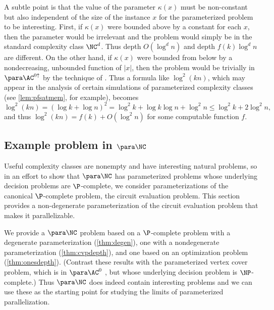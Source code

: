 A subtle point is that the value of the parameter $\kappa(x)$ must be non-constant but also independent of the size of the instance $x$ for the parameterized problem to be interesting.
First, if $\kappa(x)$ were bounded above by a constant for each $x$, then the parameter would be irrelevant and the problem would simply be in the standard complexity class $\NC^d$.
Thus depth $O(\log^d n)$ and depth $f(k) \log^d n$ are different.
On the other hand, if $\kappa(x)$ were bounded from below by a nondecreasing, unbounded function of $|x|$, then the problem would be trivially in $\para \AC^{0 \uparrow}$ by the technique of \autocite[Proposition~1.7]{fg06}.
Thus a formula like $\log^2 (kn)$, which may appear in the analysis of certain simulations of parameterized complexity classes (see \autoref{lem:pfsatmem}, for example), becomes
\[
\log^2 (kn) = (\log k + \log n)^2 = \log^2 k + \log k \log n + \log^2 n \leq \log^2 k + 2 \log^2 n,
\]
and thus $\log^2 (kn) = f(k) + O(\log^2 n)$ for some computable function $f$.

\subsection{Example problem in \texorpdfstring{$\para \NC$}{paraNC}}
\label{sec:parancexample}

%
%
%
Useful complexity classes are nonempty and have interesting natural problems,
%
%
%
so in an effort to show that $\para \NC$ has parameterized problems whose underlying decision problems are $\P$-complete,
%
%
%
we consider parameterizations of the canonical $\P$-complete problem, the circuit evaluation problem.
%
%
%
%
This section provides a non-degenerate parameterization of the circuit evaluation problem that makes it parallelizable.

%
%
%
We provide a $\para \NC$ problem based on a $\P$-complete problem with a degenerate parameterization (\autoref{thm:degen}), one with a nondegenerate parameterization (\autoref{thm:cvpdepth}), and one based on an optimization problem (\autoref{thm:onesdepth}).
(Contrast these results with the parameterized vertex cover problem, which is in $\para \AC^0$ \autocite{bst15}, but whose underlying decision problem is $\NP$-complete.)
%
%
%
Thus $\para \NC$ does indeed contain interesting problems
%
%
and we can use these as the starting point for studying the limits of parameterized parallelization.

